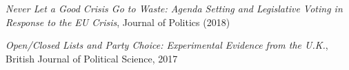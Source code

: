\documentclass[centered]{res}
\begin{document}
\begin{resume}
\vspace{-.25cm}

{\sl Never Let a Good Crisis Go to Waste: Agenda Setting and Legislative Voting in Response to the EU Crisis}, 
Journal of Politics (2018)

\vspace{-.25cm}

{\sl Open/Closed Lists and Party Choice: Experimental Evidence from the U.K.},
British Journal of Political Science, 2017







\end{resume}
\end{document}

